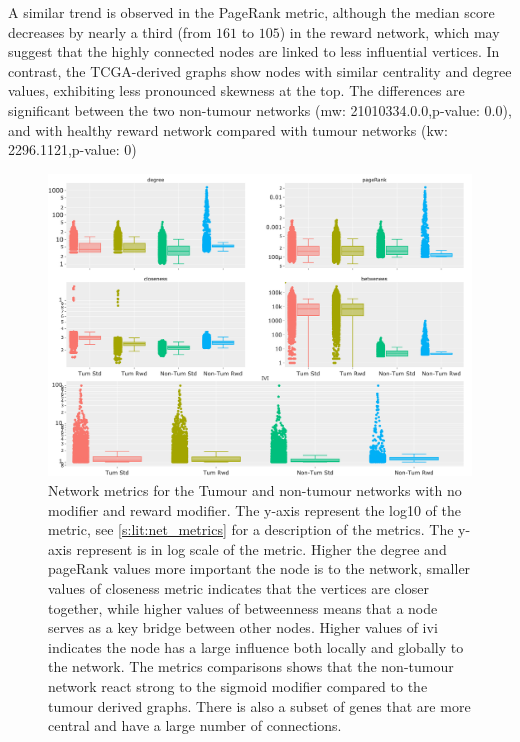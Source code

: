 A similar trend is observed in the PageRank metric, although the median score decreases by nearly a third (from $161$ to $105$) in the reward network, which may suggest that the highly connected nodes are linked to less influential vertices. In contrast, the TCGA-derived graphs show nodes with similar centrality and degree values, exhibiting less pronounced skewness at the top. The differences are significant between the two non-tumour networks (\acrshort{mw}: 21010334.0.0,p-value: 0.0), and with healthy reward network compared with tumour networks (\acrshort{kw}: 2296.1121,p-value: 0)

\begin{figure}[!htb]    
    \centering
    \includegraphics[width=1.0\textwidth,keepaspectratio]{Sections/Network_II/validation/network_comparison.png}
    \caption[Network metrics for cancerous and non-tumour graphs]{Network metrics for the Tumour and non-tumour networks with no modifier and reward modifier. The y-axis represent the log10 of the metric, see \cref{s:lit:net_metrics} for a description of the metrics. The y-axis represent is in log scale of the metric. Higher the degree and pageRank values more important the node is to the network, smaller values of closeness metric indicates that the vertices are closer together, while higher values of betweenness means that a node serves as a key bridge between other nodes. Higher values of \acrlong{ivi} indicates the node has a large influence both locally and globally to the network. The metrics comparisons shows that the non-tumour network react strong to the sigmoid modifier compared to the tumour derived graphs. There is also a subset of genes that are more central and have a large number of connections.}
    \label{fig:N_II:net_metrics_comp}
\end{figure}


